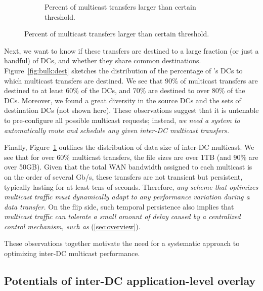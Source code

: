 \begin{figure}[t]
\begin{subfigure}[b]{0.23\textwidth}
                \caption{Percent of multicast transfers larger than certain threshold.}
                \label{fig:bulk:size}
        \end{subfigure}
        \vspace{-0.4cm}
        \label{fig:bulk}
\vspace{-0.4cm}
\end{figure}

\vspace{0.1cm}
Next, we want to know if these transfers are destined to a large 
fraction (or just a handful) of DCs, and whether they share common 
destinations. Figure~\ref{fig:bulk:dest} sketches the distribution 
of the percentage of \company's DCs to which multicast transfers 
are destined. We see that 90\% of multicast transfers are destined to 
at least 60\% of the DCs, and 70\% are destined to over 80\% of the DCs. Moreover, 
we found a great diversity in the source DCs and the sets of destination
DCs (not shown here). These observations suggest that it is untenable
to pre-configure all possible multicast requests; instead, {\em we 
need a system to automatically route and schedule any given inter-DC 
multicast transfers.}

Finally, Figure~\ref{fig:bulk:size} outlines the distribution of data 
size of inter-DC multicast. We see that for over 60\% multicast 
transfers, the file sizes are over 1TB (and 90\% are over 50GB).
Given that the total WAN bandwidth assigned to each multicast is on 
the order of several Gb/s, these transfers are not transient but 
persistent, typically lasting for at least tens of seconds.
Therefore, {\em any scheme that optimizes multicast traffic must
dynamically adapt to any performance variation during a data transfer.}
On the flip side, such temporal persistence also implies that {\em 
multicast traffic can tolerate a small amount of delay caused by 
a centralized control mechanism, such as \name} 
(\Section\ref{sec:overview}).


\vspace{0.1cm}
These observations together motivate the need for a systematic approach
to optimizing inter-DC multicast performance.

\subsection{Potentials of inter-DC application-level overlay}
\label{subsec:motivation:case-for}


